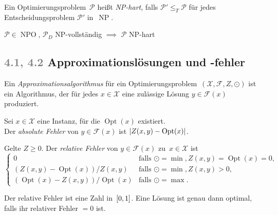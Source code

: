 \documentclass{cheat-sheet}
\newcommand{\Instances}{\mathcal{X}} %
\newcommand{\Feasible}{\mathcal{F}} %
\newcommand{\ObjFun}{Z} %
\newcommand{\Goal}{\odot} %
\newcommand{\OptTuple}{(\Instances{}, \Feasible{}, \ObjFun{}, \Goal)} %
\DeclareMathOperator{\Opt}{Opt} %
\DeclareMathOperator{\NPO}{NPO} %
\DeclareMathOperator{\NP}{NP} %
\newcommand{\Prob}{\mathcal{P}} %
\newcommand{\TuringRed}{\leq_T} %
\newcommand{\scriptSection}[1]{\textcolor{gray}{#1}\enspace}
\begin{document}
\begin{samepage}

\begin{defn}
  Ein Optimierungsproblem~$\Prob$ heißt \emph{NP-hart}, falls $\Prob' \TuringRed \Prob$ für jedes Entscheidungsproblem $\Prob'$ in~$\NP$.
\end{defn}

\begin{beob}
  $\Prob \in \NPO$, $\Prob_D$ NP-vollständig $\implies$ $\Prob$ NP-hart
\end{beob}

\subsection{\scriptSection{4.1, 4.2} Approximationslösungen und -fehler}

\begin{defn}
  Ein \emph{Approximationsalgorithmus} für ein Optimierungsproblem~$\OptTuple$ ist ein Algorithmus, der für jedes $x \in \Instances$ eine zulässige Lösung $y \in \Feasible(x)$ produziert.
\end{defn}

\begin{defn}
  Sei $x \in \Instances$ eine Instanz, für die $\Opt(x)$ existiert. \\
  Der \emph{absolute Fehler} von $y \in \Feasible(x)$ ist $\abs{Z(x, y) - \Opt(x)}$.
\end{defn}

\end{samepage}

\begin{defn}
  Gelte $Z \geq 0$.
  Der \emph{relative Fehler} von $y \in \Feasible(x)$ zu~$x \in \Instances$ ist
  \[
    \begin{cases}
      0 & \text{falls } \Goal = \min, \ObjFun(x, y) = \Opt(x) = 0, \\
      (\ObjFun(x, y) - \Opt(x)) / \ObjFun(x, y) & \text{falls } \Goal = \min, Z(x, y) > 0, \\
      (\Opt(x) - \ObjFun(x, y)) / \Opt(x) & \text{falls } \Goal = \max.
    \end{cases}
  \]
\end{defn}

\begin{bem}
  Der relative Fehler ist eine Zahl in~$\left[ 0, 1 \right]$.
  Eine Lösung ist genau dann optimal, falls ihr relativer Fehler $= 0$ ist.
\end{bem}
\end{document}
